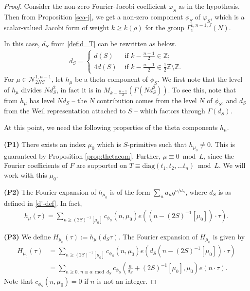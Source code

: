 \documentclass[11pt]{amsart}
\numberwithin{equation}{section}
\newcommand{\mc}{\mathcal}
\newcommand{\mrm}{\mathrm} %
\newcommand{\z}{\mathbb{Z}}
\newcommand{\sumn}{\sum \nolimits}
\begin{document}
\begin{proof}
Consider the non-zero Fourier-Jacobi coefficient $\varphi_S$ as in the hypothesis. Then from Proposition \ref{sca-j}, we get a non-zero component $\phi_S$ of $\varphi_S$, which is a scalar-valued Jacobi form of weight $k\ge k(\rho)$ for the group $\Gamma_1^{1, n-1, J}(N)$.

In this case, $d_S$ from \eqref{def:d_T} can be rewritten as below.
\begin{align} \label{d'-def}
    d_S = \begin{cases}
        d(S) & \text{ if   }  k - \frac{n-1}{2} \in \z ;\\
        4 d(S) & \text{ if   }  k - \frac{n-1}{2} \in \frac{1}{2}\z \setminus \z.
    \end{cases}
\end{align}
For $\mu \in \mc N_{2NS}^{1,n-1}$, let $h_\mu$ be a theta component of $\phi_S$. 
We first note that the level of $h_\mu$ divides $N d_S^2$, in fact it is in $M_{k - \frac{n-1}{2} }(\Gamma(N d_S^2))$. To see this, note that from \cite[\S 4, Part~B, p. 2022]{boche-das} $h_\mu$ has level $N d_S$ -- the $N$ contribution comes from the level $N$ of $\phi_S$, and $d_S$ from the Weil representation attached to $S$ -- which factors through $\Gamma(d_S)$. 

At this point, we need the following properties of the theta components $h_\mu$.

{\bf(P1)} 
There exists an index $\mu_0$ which is $S$-primitive such that $h_{\mu_0} \neq 0$. This is guaranteed by Proposition \ref{prop:thetacom}. Further, $\mu\equiv 0\bmod L$, since the Fourier coefficients of $F$ are supported on $T\equiv\mrm{diag}(t_1, t_2,...t_n)\bmod L$. We will work with this $\mu_0$.

{\bf(P2)} 
The Fourier expansion of $h_{\mu_0}$ is of the form $\sum_n a_n q^{n/ d_S}$, where $d_S$ is as defined in \eqref{d'-def}. In fact,
\begin{align}\label{hmu-FT}
        h_{\mu}(\tau) =\sumn_{n \ge (2S)^{-1}[\mu_0]} c_{\phi_S}(n ,\mu_0) e( (n- (2S)^{-1}[\mu_0]) \cdot \tau).
\end{align}

{\bf(P3)} 
We define $H_{\mu_0}(\tau):= h_\mu(d_S \tau)$. The Fourier expansion of $H_{\mu_0}$ is given by
\begin{align}
H_{\mu_0}(\tau) &=  \sumn_{n \ge (2S)^{-1}[\mu_0]} c_{\phi_S}(n ,\mu_0) e( d_S(n- (2S)^{-1}[\mu_0]) \cdot \tau) \\
    &=\sumn_{n \ge 0, \, n \equiv \alpha \bmod{d_S} } c_{\phi_S}(\frac{n}{d_S}+ (2S)^{-1}[\mu_0],\mu_0) e(n \cdot \tau) . \label{Hmu-fe}
\end{align}
Note that $c_{\phi_S}(n,\mu_0)=0$ if $n$ is not an integer.


\end{proof}
\end{document}
